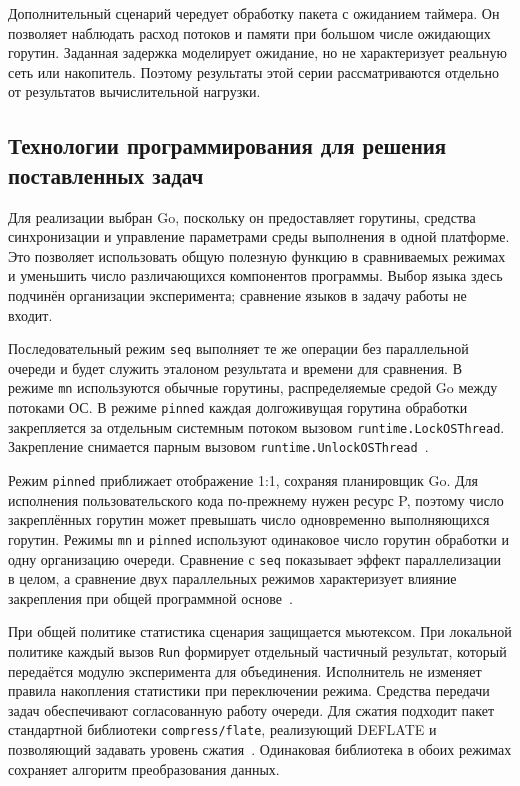 Дополнительный сценарий чередует обработку пакета с ожиданием таймера. Он позволяет наблюдать
  расход потоков и памяти при большом числе ожидающих горутин. Заданная задержка моделирует
  ожидание, но не характеризует реальную сеть или накопитель. Поэтому результаты этой серии
  рассматриваются отдельно от результатов вычислительной нагрузки.


\subsection{Технологии программирования для решения поставленных задач}
\label{subsec:implementation-technologies}

Для реализации выбран Go, поскольку он предоставляет горутины, средства синхронизации и управление
  параметрами среды выполнения в одной платформе. Это позволяет использовать общую
  полезную функцию в сравниваемых режимах и уменьшить число различающихся компонентов программы.
  Выбор языка здесь подчинён организации эксперимента; сравнение языков в задачу работы не входит.

Последовательный режим \texttt{seq} выполняет те же операции без параллельной очереди и будет служить
  эталоном результата и времени для сравнения. В режиме \texttt{mn} используются обычные горутины, распределяемые
  средой Go между потоками ОС. В режиме \texttt{pinned} каждая долгоживущая горутина обработки
  закрепляется за отдельным системным потоком вызовом \texttt{runtime.LockOSThread}.
  Закрепление снимается парным вызовом \texttt{runtime.UnlockOSThread}~\cite{go_runtime_package}.

Режим \texttt{pinned} приближает отображение 1:1, сохраняя планировщик Go. Для исполнения
  пользовательского кода по-прежнему нужен ресурс P, поэтому число закреплённых горутин может
  превышать число одновременно выполняющихся горутин. Режимы \texttt{mn} и \texttt{pinned}
  используют одинаковое число горутин обработки и одну организацию очереди. Сравнение с
  \texttt{seq} показывает эффект параллелизации в целом, а сравнение двух параллельных режимов
  характеризует влияние закрепления при общей программной основе~\cite{go_runtime_hacking}.

При общей политике статистика сценария защищается мьютексом. При локальной политике каждый вызов
  \texttt{Run} формирует отдельный частичный результат, который передаётся модулю эксперимента
  для объединения. Исполнитель не изменяет правила накопления статистики при переключении режима.
  Средства передачи задач обеспечивают согласованную работу очереди.
  Для сжатия подходит пакет стандартной библиотеки \texttt{compress/flate}, реализующий DEFLATE
  и позволяющий задавать уровень сжатия~\cite{go_flate_package}. Одинаковая библиотека в обоих
  режимах сохраняет алгоритм преобразования данных.

